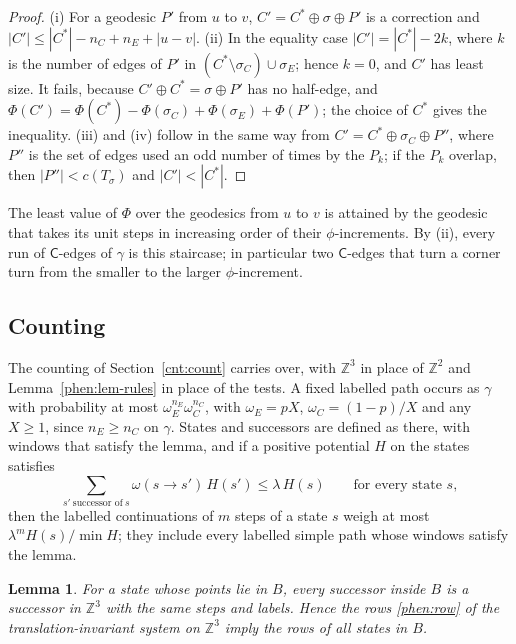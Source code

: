 \documentclass[11pt]{amsart}
\newtheorem{lemma}[theorem]{Lemma}
\theoremstyle{definition}
\theoremstyle{remark}
\numberwithin{equation}{section}
\begin{document}
\begin{proof}
(i) For a geodesic $P'$ from $u$ to $v$, $C'=C^\ast\oplus\sigma\oplus P'$ is a correction and
$|C'|\le|C^\ast|-n_C+n_E+|u-v|$. (ii) In the equality case $|C'|=|C^\ast|-2k$, where $k$ is the number of edges of
$P'$ in $(C^\ast\setminus\sigma_C)\cup\sigma_E$; hence $k=0$, and $C'$ has least size. It fails, because
$C'\oplus C^\ast=\sigma\oplus P'$ has no half-edge, and $\Phi(C')=\Phi(C^\ast)-\Phi(\sigma_C)+\Phi(\sigma_E)+\Phi(P')$;
the choice of $C^\ast$ gives the inequality. (iii) and (iv) follow in the same way from $C'=C^\ast\oplus\sigma_C\oplus
P''$, where $P''$ is the set of edges used an odd number of times by the $P_k$; if the $P_k$ overlap, then
$|P''|<c(T_\sigma)$ and $|C'|<|C^\ast|$.
\end{proof}

The least value of $\Phi$ over the geodesics from $u$ to $v$ is attained by the geodesic that takes its unit steps in
increasing order of their $\phi$-increments. By (ii), every run of $\mathsf C$-edges of $\gamma$ is this staircase; in
particular two $\mathsf C$-edges that turn a corner turn from the smaller to the larger $\phi$-increment.

\subsection{Counting}\label{phen:count}
The counting of Section~\ref{cnt:count} carries over, with $\mathbb Z^3$ in place of $\mathbb Z^2$ and
Lemma~\ref{phen:lem-rules} in place of the tests. A fixed labelled path occurs as $\gamma$ with probability at most
$\omega_E^{n_E}\omega_C^{n_C}$, with $\omega_E=pX$, $\omega_C=(1-p)/X$ and any $X\ge1$, since $n_E\ge n_C$ on
$\gamma$. States and successors are defined as there, with windows that satisfy the lemma, and if a positive potential
$H$ on the states satisfies
\begin{equation}\label{phen:row}
  \sum_{s'\ \text{successor of}\ s}\omega(s\to s')\,H(s')\le\lambda\,H(s)\qquad\text{for every state }s,
\end{equation}
then the labelled continuations of $m$ steps of a state $s$ weigh at most $\lambda^mH(s)/\min H$; they include every
labelled simple path whose windows satisfy the lemma.

\begin{lemma}\label{phen:lem-box}
For a state whose points lie in $B$, every successor inside $B$ is a successor in $\mathbb Z^3$ with the same steps
and labels. Hence the rows \eqref{phen:row} of the translation-invariant system on $\mathbb Z^3$ imply the rows of all
states in $B$.
\end{lemma}
\end{document}
